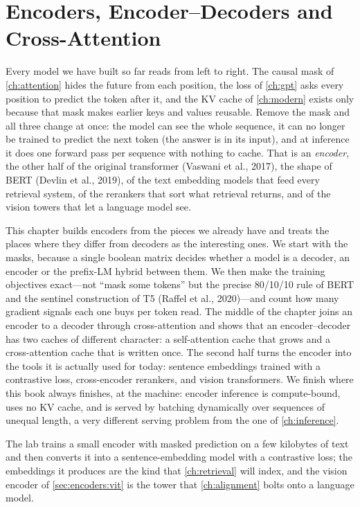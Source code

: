 \chapter{Encoders, Encoder--Decoders and Cross-Attention}\label{ch:encoders}

Every model we have built so far reads from left to right. The causal mask of \cref{ch:attention}
hides the future from each position, the loss of \cref{ch:gpt} asks every position to predict the
token after it, and the KV cache of \cref{ch:modern} exists only because that mask makes earlier
keys and values reusable. Remove the mask and all three change at once: the model can see the whole
sequence, it can no longer be trained to predict the next token (the answer is in its input), and at
inference it does one forward pass per sequence with nothing to cache. That is an \emph{encoder}, the
other half of the original transformer (Vaswani et al., 2017), the shape of BERT (Devlin et al.,
2019), of the text embedding models that feed every retrieval system, of the rerankers that sort what
retrieval returns, and of the vision towers that let a language model see.

This chapter builds encoders from the pieces we already have and treats the places where they differ
from decoders as the interesting ones. We start with the masks, because a single boolean matrix
decides whether a model is a decoder, an encoder or the prefix-LM hybrid between them. We then make the
training objectives exact---not ``mask some tokens'' but the precise 80/10/10 rule of BERT and the
sentinel construction of T5 (Raffel et al., 2020)---and count how many gradient signals each one buys
per token read. The middle of the chapter joins an encoder to a decoder through cross-attention and
shows that an encoder--decoder has two caches of different character: a self-attention cache that
grows and a cross-attention cache that is written once. The second half turns the encoder into the
tools it is actually used for today: sentence embeddings trained with a contrastive loss, cross-encoder
rerankers, and vision transformers. We finish where this book always finishes, at the machine: encoder
inference is compute-bound, uses no KV cache, and is served by batching dynamically over sequences of
unequal length, a very different serving problem from the one of \cref{ch:inference}.

The lab trains a small encoder with masked prediction on a few kilobytes of text and then converts it
into a sentence-embedding model with a contrastive loss; the embeddings it produces are the kind that
\cref{ch:retrieval} will index, and the vision encoder of \cref{sec:encoders:vit} is the tower that
\cref{ch:alignment} bolts onto a language model.

